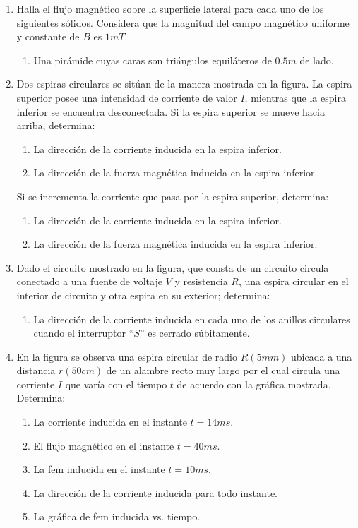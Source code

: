\documentclass[10pt, twoside]{article}
\begin{document}
\begin{enumerate}
	\item Halla el flujo magnético sobre la superficie lateral para cada uno
		de los siguientes sólidos.
		Considera que la magnitud del campo magnético uniforme y constante de
		$B$ es $1mT$.
		\begin{enumerate}
			\item Una pirámide cuyas caras son triángulos equiláteros de
				$0.5m$ de lado.
		\end{enumerate}
	\item Dos espiras circulares se sitúan de la manera mostrada en la figura.
		La espira superior posee una intensidad de corriente de valor $I$,
		mientras que la espira inferior se encuentra desconectada.
		Si la espira superior se mueve hacia arriba, determina:
		\begin{enumerate}
			\item La dirección de la corriente inducida en la espira inferior.
			\item La dirección de la fuerza magnética inducida en la espira inferior.
		\end{enumerate}
		Si se incrementa la corriente que pasa por la espira superior, determina:
		\begin{enumerate}
			\item La dirección de la corriente inducida en la espira inferior.
			\item La dirección de la fuerza magnética inducida en la espira inferior.
		\end{enumerate}
	\item Dado el circuito mostrado en la figura, que consta de un circuito
		circula conectado a una fuente de voltaje $V$ y resistencia $R$,
		una espira circular en el interior de circuito y otra espira
		en su exterior; determina:
		\begin{enumerate}
			\item La dirección de la corriente inducida en cada uno de los
				anillos circulares cuando el interruptor ``$S$'' es
				cerrado súbitamente.
		\end{enumerate}
	\item En la figura se observa una espira circular de radio $R(5mm)$ ubicada
		a una distancia $r(50cm)$ de un alambre recto muy largo por el cual
		circula una corriente $I$ que varía con el tiempo $t$ de acuerdo con
		la gráfica mostrada.
		Determina:
		\begin{enumerate}
			\item La corriente inducida en el instante $t=14ms$.
			\item El flujo magnético en el instante $t=40ms$.
			\item La fem inducida en el instante $t=10ms$.
			\item La dirección de la corriente inducida para todo instante.
			\item La gráfica de fem inducida vs. tiempo.
		\end{enumerate}
\end{enumerate}
\end{document}
